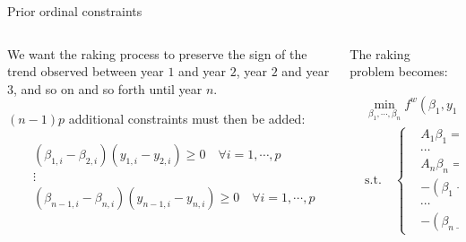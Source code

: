 \documentclass[aspectratio=169]{beamer}
\begin{document}
\begin{frame}{Prior ordinal constraints}
	\begin{columns}

	\begin{column}{.5\textwidth}
		We want the raking process to preserve the sign of the trend observed between year $1$ and year $2$, year $2$ and year $3$, and so on and so forth until year $n$.

		\vspace{1em}

		$\left( n - 1 \right) p $ additional constraints must then be added:

		\vspace{1em}

		\begin{equation*}
		\begin{aligned}
		&\left( \beta_{1,i} - \beta_{2,i} \right) \left( y_{1,i} - y_{2,i} \right) \geq 0 \quad \forall i = 1 , \cdots , p \\
		& \vdots \\
		&\left( \beta_{n-1,i} - \beta_{n,i} \right) \left( y_{n-1,i} - y_{n,i} \right) \geq 0 \quad \forall i = 1 , \cdots , p
		\end{aligned}
		\end{equation*}
	\end{column}

	\begin{column}{.5\textwidth}
		The raking problem becomes:

		\begin{equation*}
		\begin{aligned}
		& \min_{\beta_1 , \cdots , \beta_n} f^w \left( \beta_1 , y_1 \right) + \cdots + f^w \left( \beta_n , y_n \right) \\
		& \text{s.t.} \quad \left\{
			\begin{aligned}
			& A_1 \beta_1 = s_1, \\
			& \cdots \\
			& A_n \beta_n = s_n, \\
			& - \left( \beta_1 - \beta_2 \right) \odot \left( y_1 - y_2 \right) \leq 0 \\
			& \cdots \\
			& - \left( \beta_{n-1} - \beta_n \right) \odot \left( y_{n-1} - y_n \right) \leq 0
			\end{aligned}
			\right.
		\end{aligned}
		\end{equation*}
	\end{column}
	\end{columns}
\end{frame}
\end{document}
